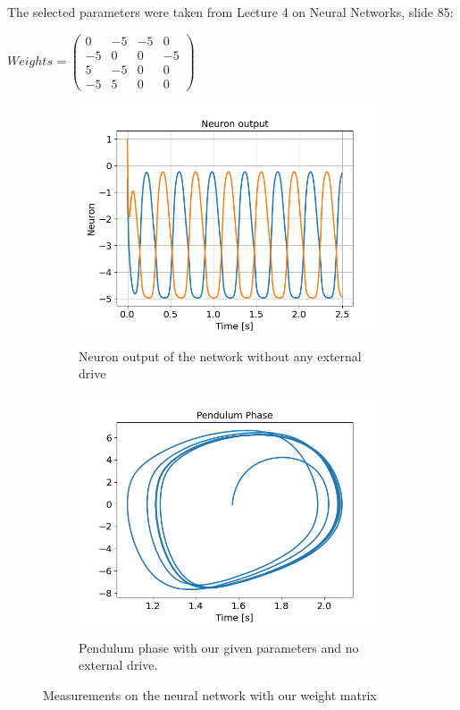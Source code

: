 \documentclass{cmc}
\begin{document}
The selected parameters were taken from Lecture 4 on Neural Networks, slide 85:
\begin{center}
$
Weights =
\begin{pmatrix}
0 & -5 & -5 & 0\\
-5 & 0 & 0 & -5\\
5 & -5 & 0 & 0\\
-5 & 5 & 0 & 0
\end{pmatrix}
$
\end{center}

\begin{figure}[H]
 \centering
  \begin{subfigure}[b]{0.45\textwidth}
    { \centering
      \includegraphics[width=0.99\textwidth]{figures/3a_neuron_output.png} }
    \caption{Neuron output of the network without any external drive}
    \label{fig:3a_neuron_output}
  \end{subfigure}
  \begin{subfigure}[b]{0.45\textwidth}
    { \centering
      \includegraphics[width=0.99\textwidth]{figures/3a_pendulum_Phase.png} }
    \caption{Pendulum phase with our given parameters and no external drive.}
    \label{fig:3b_pendulum_phase}
  \end{subfigure}
  \caption{Measurements on the neural network with our weight matrix}
  \label{fig:3a}
\end{figure}
\end{document}
